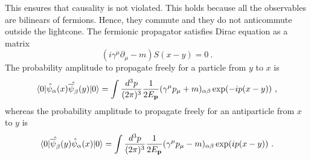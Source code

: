     This ensures that causality is not violated. This holds because all the observables are bilinears of fermions. Hence, they commute and they do not anticommute outside the lightcone. The fermionic propagator satisfies Dirac equation as a matrix 
    \begin{equation*}
        (i \gamma^\mu \partial_\mu - m) S(x-y) = 0~.
    \end{equation*}
    The probability amplitude to propagate freely for a particle from $y$ to $x$ is 
    \begin{equation*}
        \langle0\vert \hat \psi_\alpha (x) \hat {\overline \psi_\beta} (y) \vert0\rangle = \int \frac{d^3 p}{(2\pi)^3} \frac{1}{2E_{\mathbf p}} (\gamma^\mu p_\mu + m)_{\alpha\beta} \exp(- i p (x-y)) ~,
    \end{equation*}
    whereas the probability amplitude to propagate freely for an antiparticle from $x$ to $y$ is 
    \begin{equation*}
        \langle0\vert \hat {\overline \psi_\beta} (y) \hat \psi_\alpha (x) \vert0\rangle = \int \frac{d^3 p}{(2\pi)^3} \frac{1}{2E_{\mathbf p}} (\gamma^\mu p_\mu - m)_{\alpha\beta} \exp(i p (x-y)) ~.
    \end{equation*}
